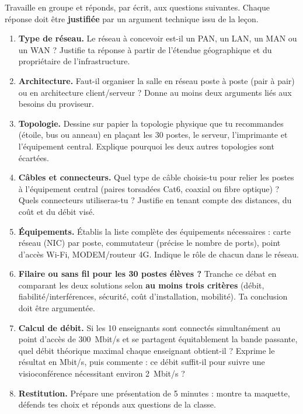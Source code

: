 \documentclass[11pt]{article}
\newcounter{popsec}
\newcounter{popsub}
\newcommand{\courssub}[1]{%
  \stepcounter{popsub}%
  \par\vspace{9pt}\noindent{\popxbold\fontsize{11.5}{13}\selectfont\color{popink}{\color{poporange}\thepopsec.\thepopsub}\hspace{6pt}#1}\par\nopagebreak\vspace{4pt}
}
\begin{document}
\courssub{Consignes}

Travaille en groupe et réponds, par écrit, aux questions suivantes. Chaque réponse doit être \textbf{justifiée} par un argument technique issu de la leçon.

\begin{enumerate}
\item \textbf{Type de réseau.} Le réseau à concevoir est-il un PAN, un LAN, un MAN ou un WAN ? Justifie ta réponse à partir de l'étendue géographique et du propriétaire de l'infrastructure.
\item \textbf{Architecture.} Faut-il organiser la salle en réseau poste à poste (pair à pair) ou en architecture client/serveur ? Donne au moins deux arguments liés aux besoins du proviseur.
\item \textbf{Topologie.} Dessine sur papier la topologie physique que tu recommandes (étoile, bus ou anneau) en plaçant les 30 postes, le serveur, l'imprimante et l'équipement central. Explique pourquoi les deux autres topologies sont écartées.
\item \textbf{Câbles et connecteurs.} Quel type de câble choisis-tu pour relier les postes à l'équipement central (paires torsadées Cat6, coaxial ou fibre optique) ? Quels connecteurs utiliseras-tu ? Justifie en tenant compte des distances, du coût et du débit visé.
\item \textbf{Équipements.} Établis la liste complète des équipements nécessaires : carte réseau (NIC) par poste, commutateur (précise le nombre de ports), point d'accès Wi-Fi, MODEM/routeur 4G. Indique le rôle de chacun dans le réseau.
\item \textbf{Filaire ou sans fil pour les 30 postes élèves ?} Tranche ce débat en comparant les deux solutions selon \textbf{au moins trois critères} (débit, fiabilité/interférences, sécurité, coût d'installation, mobilité). Ta conclusion doit être argumentée.
\item \textbf{Calcul de débit.} Si les 10 enseignants sont connectés simultanément au point d'accès de \SI{300}{Mbit/s} et se partagent équitablement la bande passante, quel débit théorique maximal chaque enseignant obtient-il ? Exprime le résultat en Mbit/s, puis commente : ce débit suffit-il pour suivre une visioconférence nécessitant environ \SI{2}{Mbit/s} ?
\item \textbf{Restitution.} Prépare une présentation de 5 minutes : montre ta maquette, défends tes choix et réponds aux questions de la classe.
\end{enumerate}
\end{document}
